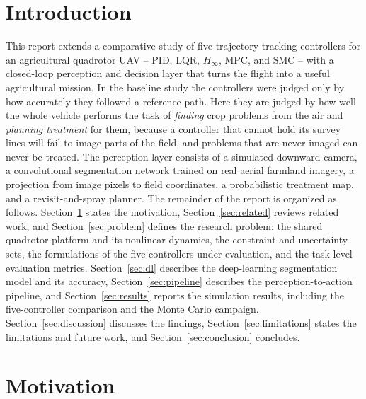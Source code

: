 \documentclass[12pt,a4paper]{article}
\begin{document}
\section*{Introduction}
This report extends a comparative study of five trajectory-tracking controllers
for an agricultural quadrotor UAV -- PID, LQR, $H_\infty$, MPC, and SMC -- with a
closed-loop perception and decision layer that turns the flight into a useful
agricultural mission. In the baseline study the controllers were judged only by
how accurately they followed a reference path. Here they are judged by how well the
whole vehicle performs the task of \emph{finding} crop problems from the air and
\emph{planning treatment} for them, because a controller that cannot hold its survey
lines will fail to image parts of the field, and problems that are never imaged can
never be treated. The perception layer consists of a simulated downward camera, a
convolutional segmentation network trained on real aerial farmland imagery, a
projection from image pixels to field coordinates, a probabilistic treatment map,
and a revisit-and-spray planner. The remainder of the report is organized as
follows. Section~\ref{sec:motivation} states the motivation, Section~\ref{sec:related}
reviews related work, and Section~\ref{sec:problem} defines the research problem: the
shared quadrotor platform and its nonlinear dynamics, the constraint and uncertainty
sets, the formulations of the five controllers under evaluation, and the task-level
evaluation metrics. Section~\ref{sec:dl} describes the deep-learning segmentation model
and its accuracy, Section~\ref{sec:pipeline} describes the perception-to-action
pipeline, and Section~\ref{sec:results} reports the simulation results, including the
five-controller comparison and the Monte Carlo campaign. Section~\ref{sec:discussion} discusses the findings,
Section~\ref{sec:limitations} states the limitations and future work, and
Section~\ref{sec:conclusion} concludes.

\clearpage

\section{Motivation}\label{sec:motivation}
\end{document}
